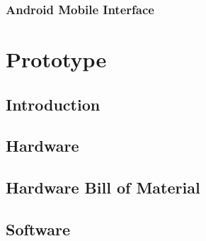 \documentclass[12pt,]{book}
\begin{document}
	\subsection{Android Mobile Interface}
	
	\newpage
	\chapter{Prototype}
	
	\section{Introduction}
	
	\section{Hardware}
	
	\section{Hardware Bill of Material}
		
	\section{Software}
	
\end{document}
